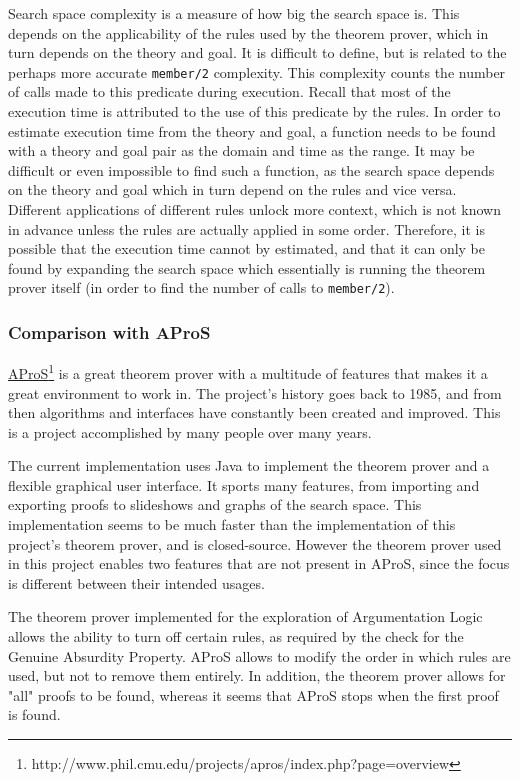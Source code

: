 \documentclass[11pt,twoside,a4paper]{report}
\begin{document}
Search space complexity is a measure of how big the search space is. This depends on the applicability of the rules used by the theorem prover, which in turn depends on the theory and goal. It is difficult to define, but is related to the perhaps more accurate \lstinline$member/2$ complexity. This complexity counts the number of calls made to this predicate during execution. Recall that most of the execution time is attributed to the use of this predicate by the rules. In order to estimate execution time from the theory and goal, a function needs to be found with a theory and goal pair as the domain and time as the range. It may be difficult or even impossible to find such a function, as the search space depends on the theory and goal which in turn depend on the rules and vice versa. Different applications of different rules unlock more context, which is not known in advance unless the rules are actually applied in some order. Therefore, it is possible that the execution time cannot by estimated, and that it can only be found by expanding the search space which essentially is running the theorem prover itself (in order to find the number of calls to \lstinline$member/2$).

\subsubsection{Comparison with AProS}
\href{http://www.phil.cmu.edu/projects/apros/index.php?page=overview}{AProS}\footnote{http://www.phil.cmu.edu/projects/apros/index.php?page=overview} is a great theorem prover with a multitude of features that makes it a great environment to work in. The project's history goes back to 1985, and from then algorithms and interfaces have constantly been created and improved. This is a project accomplished by many people over many years.

The current implementation uses Java to implement the theorem prover and a flexible graphical user interface. It sports many features, from importing and exporting proofs to slideshows and graphs of the search space. This implementation seems to be much faster than the implementation of this project's theorem prover, and is closed-source. However the theorem prover used in this project enables two features that are not present in AProS, since the focus is different between their intended usages.

The theorem prover implemented for the exploration of Argumentation Logic allows the ability to turn off certain rules, as required by the check for the Genuine Absurdity Property. AProS allows to modify the order in which rules are used, but not to remove them entirely. In addition, the theorem prover allows for "all" proofs to be found, whereas it seems that AProS stops when the first proof is found.
\end{document}
